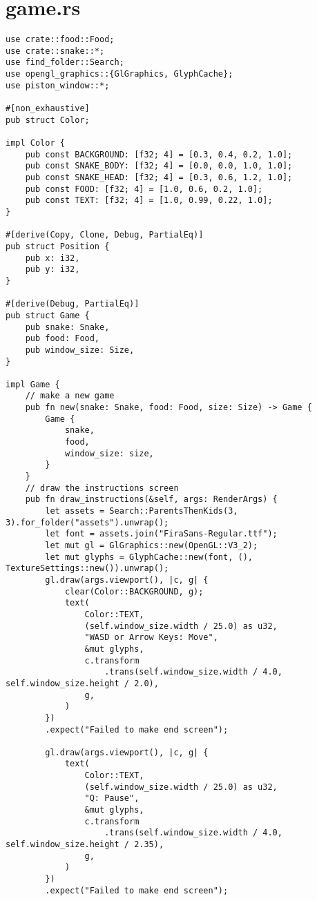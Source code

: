 \documentclass{article}
\begin{document}
\section{game.rs}
\begin{verbatim}
use crate::food::Food;
use crate::snake::*;
use find_folder::Search;
use opengl_graphics::{GlGraphics, GlyphCache};
use piston_window::*;

#[non_exhaustive]
pub struct Color;

impl Color {
    pub const BACKGROUND: [f32; 4] = [0.3, 0.4, 0.2, 1.0];
    pub const SNAKE_BODY: [f32; 4] = [0.0, 0.0, 1.0, 1.0];
    pub const SNAKE_HEAD: [f32; 4] = [0.3, 0.6, 1.2, 1.0];
    pub const FOOD: [f32; 4] = [1.0, 0.6, 0.2, 1.0];
    pub const TEXT: [f32; 4] = [1.0, 0.99, 0.22, 1.0];
}

#[derive(Copy, Clone, Debug, PartialEq)]
pub struct Position {
    pub x: i32,
    pub y: i32,
}

#[derive(Debug, PartialEq)]
pub struct Game {
    pub snake: Snake,
    pub food: Food,
    pub window_size: Size,
}

impl Game {
    // make a new game
    pub fn new(snake: Snake, food: Food, size: Size) -> Game {
        Game {
            snake,
            food,
            window_size: size,
        }
    }
    // draw the instructions screen
    pub fn draw_instructions(&self, args: RenderArgs) {
        let assets = Search::ParentsThenKids(3, 3).for_folder("assets").unwrap();
        let font = assets.join("FiraSans-Regular.ttf");
        let mut gl = GlGraphics::new(OpenGL::V3_2);
        let mut glyphs = GlyphCache::new(font, (), TextureSettings::new()).unwrap();
        gl.draw(args.viewport(), |c, g| {
            clear(Color::BACKGROUND, g);
            text(
                Color::TEXT,
                (self.window_size.width / 25.0) as u32,
                "WASD or Arrow Keys: Move",
                &mut glyphs,
                c.transform
                    .trans(self.window_size.width / 4.0, self.window_size.height / 2.0),
                g,
            )
        })
        .expect("Failed to make end screen");

        gl.draw(args.viewport(), |c, g| {
            text(
                Color::TEXT,
                (self.window_size.width / 25.0) as u32,
                "Q: Pause",
                &mut glyphs,
                c.transform
                    .trans(self.window_size.width / 4.0, self.window_size.height / 2.35),
                g,
            )
        })
        .expect("Failed to make end screen");


\end{verbatim}
\end{document}

